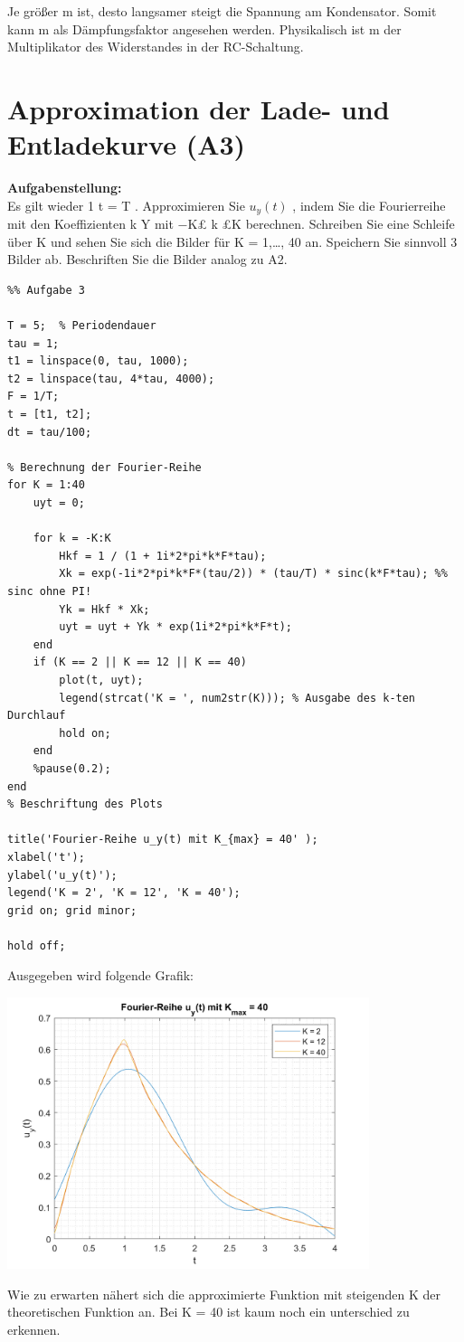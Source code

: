 Je größer m ist, desto langsamer steigt die Spannung am Kondensator. Somit kann m als Dämpfungsfaktor angesehen werden. Physikalisch ist m der Multiplikator des Widerstandes in der RC-Schaltung.

\newpage

\section{Approximation der Lade- und Entladekurve (A3)}

\textbf{Aufgabenstellung:\\}
Es gilt wieder 1 t = T . Approximieren Sie $u_y(t)$ , indem Sie die Fourierreihe mit den Koeffizienten k Y mit −K£ k £K berechnen. Schreiben Sie eine Schleife über K und sehen Sie sich die Bilder für K = 1,…, 40 an. Speichern Sie sinnvoll 3 Bilder ab. Beschriften Sie die Bilder analog zu A2.

\vspace{0.5cm}

\begin{lstlisting}
%% Aufgabe 3

T = 5;  % Periodendauer
tau = 1;
t1 = linspace(0, tau, 1000);
t2 = linspace(tau, 4*tau, 4000);
F = 1/T;
t = [t1, t2];
dt = tau/100;

% Berechnung der Fourier-Reihe
for K = 1:40
	uyt = 0;
	
	for k = -K:K
		Hkf = 1 / (1 + 1i*2*pi*k*F*tau);
		Xk = exp(-1i*2*pi*k*F*(tau/2)) * (tau/T) * sinc(k*F*tau); %% sinc ohne PI!
		Yk = Hkf * Xk;
		uyt = uyt + Yk * exp(1i*2*pi*k*F*t);
	end
	if (K == 2 || K == 12 || K == 40)
		plot(t, uyt);
		legend(strcat('K = ', num2str(K))); % Ausgabe des k-ten Durchlauf
		hold on;
	end
	%pause(0.2);
end
% Beschriftung des Plots
	
title('Fourier-Reihe u_y(t) mit K_{max} = 40' );
xlabel('t');
ylabel('u_y(t)');
legend('K = 2', 'K = 12', 'K = 40');
grid on; grid minor;
	
hold off;
\end{lstlisting}

\newpage

Ausgegeben wird folgende Grafik:

\begin{center}
	\includegraphics[width=300pt]{img/aufgabe3.png}
\end{center}

Wie zu erwarten nähert sich die approximierte Funktion mit steigenden K der theoretischen Funktion an. Bei K = 40 ist kaum noch ein unterschied zu erkennen.